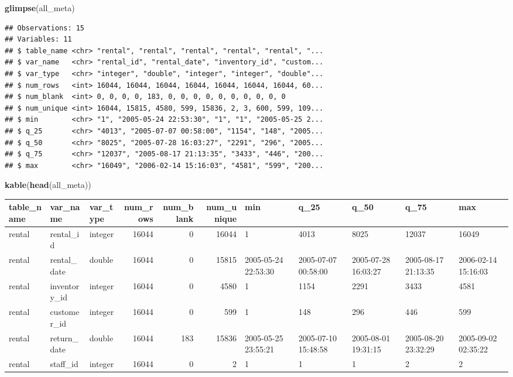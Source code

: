 \documentclass[]{book}
\newenvironment{Shaded}{\begin{snugshade}}{\end{snugshade}}
\newcommand{\KeywordTok}[1]{\textcolor[rgb]{0.13,0.29,0.53}{\textbf{#1}}}
\newcommand{\NormalTok}[1]{#1}
\theoremstyle{definition}
\theoremstyle{definition}
\theoremstyle{definition}
\theoremstyle{remark}
\begin{document}
\begin{Shaded}
\begin{Highlighting}[]
\KeywordTok{glimpse}\NormalTok{(all_meta)}
\end{Highlighting}
\end{Shaded}

\begin{verbatim}
## Observations: 15
## Variables: 11
## $ table_name <chr> "rental", "rental", "rental", "rental", "rental", "...
## $ var_name   <chr> "rental_id", "rental_date", "inventory_id", "custom...
## $ var_type   <chr> "integer", "double", "integer", "integer", "double"...
## $ num_rows   <int> 16044, 16044, 16044, 16044, 16044, 16044, 16044, 60...
## $ num_blank  <int> 0, 0, 0, 0, 183, 0, 0, 0, 0, 0, 0, 0, 0, 0, 0
## $ num_unique <int> 16044, 15815, 4580, 599, 15836, 2, 3, 600, 599, 109...
## $ min        <chr> "1", "2005-05-24 22:53:30", "1", "1", "2005-05-25 2...
## $ q_25       <chr> "4013", "2005-07-07 00:58:00", "1154", "148", "2005...
## $ q_50       <chr> "8025", "2005-07-28 16:03:27", "2291", "296", "2005...
## $ q_75       <chr> "12037", "2005-08-17 21:13:35", "3433", "446", "200...
## $ max        <chr> "16049", "2006-02-14 15:16:03", "4581", "599", "200...
\end{verbatim}

\begin{Shaded}
\begin{Highlighting}[]
\KeywordTok{kable}\NormalTok{(}\KeywordTok{head}\NormalTok{(all_meta))}
\end{Highlighting}
\end{Shaded}

\begin{tabular}{l|l|l|r|r|r|l|l|l|l|l}
\hline
table\_name & var\_name & var\_type & num\_rows & num\_blank & num\_unique & min & q\_25 & q\_50 & q\_75 & max\\
\hline
rental & rental\_id & integer & 16044 & 0 & 16044 & 1 & 4013 & 8025 & 12037 & 16049\\
\hline
rental & rental\_date & double & 16044 & 0 & 15815 & 2005-05-24 22:53:30 & 2005-07-07 00:58:00 & 2005-07-28 16:03:27 & 2005-08-17 21:13:35 & 2006-02-14 15:16:03\\
\hline
rental & inventory\_id & integer & 16044 & 0 & 4580 & 1 & 1154 & 2291 & 3433 & 4581\\
\hline
rental & customer\_id & integer & 16044 & 0 & 599 & 1 & 148 & 296 & 446 & 599\\
\hline
rental & return\_date & double & 16044 & 183 & 15836 & 2005-05-25 23:55:21 & 2005-07-10 15:48:58 & 2005-08-01 19:31:15 & 2005-08-20 23:32:29 & 2005-09-02 02:35:22\\
\hline
rental & staff\_id & integer & 16044 & 0 & 2 & 1 & 1 & 1 & 2 & 2\\
\hline
\end{tabular}
\end{document}
